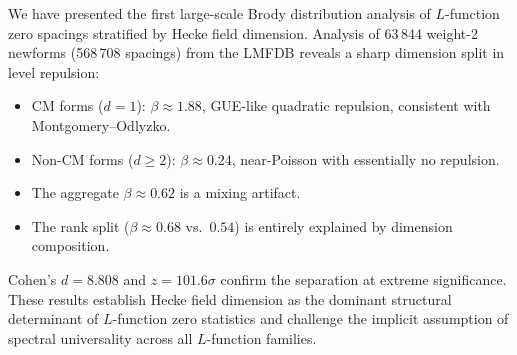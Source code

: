 \documentclass[11pt]{article}
\begin{document}
We have presented the first large-scale Brody distribution analysis of
$L$-function zero spacings stratified by Hecke field dimension.
Analysis of 63\,844 weight-2 newforms (568\,708 spacings) from the
LMFDB reveals a sharp dimension split in level repulsion:

\begin{itemize}
  \item CM forms ($d=1$): $\beta \approx 1.88$, GUE-like quadratic
    repulsion, consistent with Montgomery--Odlyzko.
  \item Non-CM forms ($d\ge2$): $\beta \approx 0.24$, near-Poisson
    with essentially no repulsion.
  \item The aggregate $\beta\approx0.62$ is a mixing artifact.
  \item The rank split ($\beta\approx0.68$ vs.\ $0.54$) is entirely
    explained by dimension composition.
\end{itemize}

Cohen's $d = 8.808$ and $z = 101.6\sigma$ confirm the separation at
extreme significance.  These results establish Hecke field dimension as
the dominant structural determinant of $L$-function zero statistics
and challenge the implicit assumption of spectral universality across
all $L$-function families.
\end{document}
